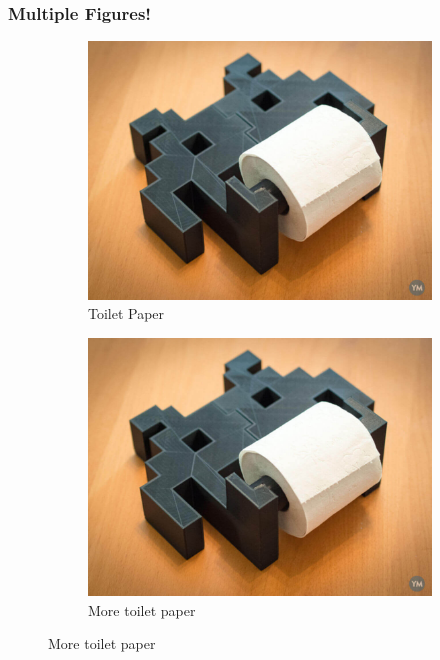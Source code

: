 \documentclass{article}
\begin{document}
            \subsubsection{Multiple Figures!}
                \begin{figure}[H]
                    \centering
                    \begin{subfigure}[b]{0.4\linewidth}
                        \includegraphics[width=\linewidth]{large_Space_Invader_Print_preview_featured.jpg}
                        \caption{Toilet Paper}
                    \end{subfigure}
                    \begin{subfigure}[b]{0.4\linewidth}
                        \includegraphics[width=\linewidth]{large_Space_Invader_Print_preview_featured.jpg}
                        \caption{More toilet paper}
                    \end{subfigure}


\end{figure}
\end{document}
